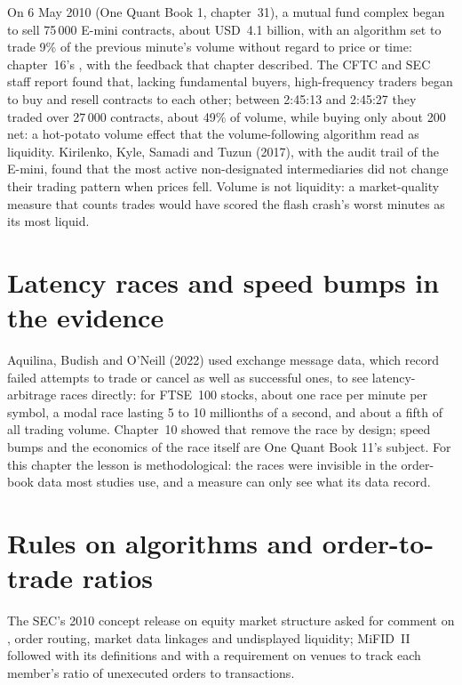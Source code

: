 On 6 May 2010 (One Quant Book 1, chapter~31), a mutual fund complex began to sell 75\,000 E-mini contracts, about USD~4.1 billion, with an algorithm set to
trade 9\% of the previous minute's volume without regard to price or time: chapter~16's , with the feedback that chapter
described. The CFTC and SEC staff report found that, lacking fundamental buyers, high-frequency traders began to buy and resell contracts to each
other; between 2:45:13 and 2:45:27 they traded over 27\,000 contracts, about 49\% of volume, while buying only about 200 net: a hot-potato volume effect
that the volume-following algorithm read as liquidity. Kirilenko, Kyle, Samadi and Tuzun (2017), with the audit trail of the E-mini, found that the
most active non-designated intermediaries did not change their trading pattern when prices fell. Volume is not liquidity: a market-quality measure that
counts trades would have scored the flash crash's worst minutes as its most liquid.

\section{Latency races and speed bumps in the evidence}

Aquilina, Budish and O'Neill (2022) used exchange message data, which record failed attempts to trade or cancel as well as successful ones, to see
latency-arbitrage races directly: for FTSE~100 stocks, about one race per minute per symbol, a modal race lasting 5 to 10 millionths of a second, and
about a fifth of all trading volume. Chapter~10 showed that  remove the race by design; speed bumps and the economics of the race
itself are One Quant Book 11's subject. For this chapter the lesson is methodological: the races were invisible in the order-book data most studies
use, and a measure can only see what its data record.

\section{Rules on algorithms and order-to-trade ratios}

The SEC's 2010 concept release on equity market structure asked for comment on , order routing, market data linkages and
undisplayed liquidity; MiFID~II followed with its definitions and with a requirement on venues to track each member's ratio of unexecuted orders to
transactions.

